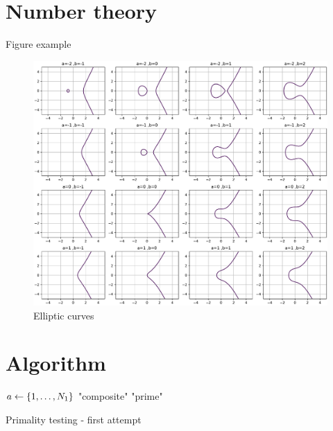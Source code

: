 \section{Number theory}
Figure example
\begin{figure}[!ht]
    \centering
    \includegraphics[width=1\linewidth]{./figure/elliptic_curves.pdf}
    \caption{Elliptic curves \cite{childsUniversalComputationQuantum2009} }
\end{figure}


\section{Algorithm}
\begin{algorithm}[H]
    \BlankLine
     {
        $a\leftarrow \qty{1,\dots,N_1}$\;
    {\Return "composite"}
    }
    \Return "prime"
    \caption{Primality testing - first attempt}
    \label{alg:miller_rabin}
\end{algorithm}
